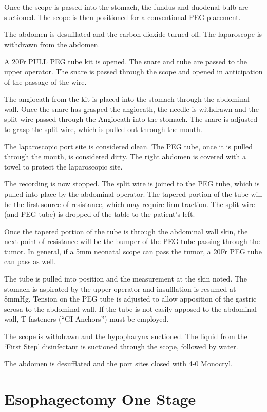 \documentclass[
]{book}
\begin{document}
Once the scope is passed into the stomach, the fundus and duodenal bulb are suctioned. The scope is then positioned for a conventional PEG placement.

The abdomen is desufflated and the carbon dioxide turned off. The laparoscope is withdrawn from the abdomen.

A 20Fr PULL PEG tube kit is opened. The snare and tube are passed to the upper operator. The snare is passed through the scope and opened in anticipation of the passage of the wire.

The angiocath from the kit is placed into the stomach through the abdominal wall. Once the snare has grasped the angiocath, the needle is withdrawn and the split wire passed through the Angiocath into the stomach. The snare is adjusted to grasp the split wire, which is pulled out through the mouth.

The laparoscopic port site is considered clean. The PEG tube, once it is pulled through the mouth, is considered dirty. The right abdomen is covered with a towel to protect the laparoscopic site.

The recording is now stopped. The split wire is joined to the PEG tube, which is pulled into place by the abdominal operator. The tapered portion of the tube will be the first source of resistance, which may require firm traction. The split wire (and PEG tube) is dropped of the table to the patient's left.

Once the tapered portion of the tube is through the abdominal wall skin, the next point of resistance will be the bumper of the PEG tube passing through the tumor. In general, if a 5mm neonatal scope can pass the tumor, a 20Fr PEG tube can pass as well.

The tube is pulled into position and the measurement at the skin noted. The stomach is aspirated by the upper operator and insufflation is resumed at 8mmHg. Tension on the PEG tube is adjusted to allow apposition of the gastric serosa to the abdominal wall. If the tube is not easily apposed to the abdominal wall, T fasteners (``GI Anchors'') must be employed.

The scope is withdrawn and the hypopharynx suctioned. The liquid from the `First Step' disinfectant is suctioned through the scope, followed by water.

The abdomen is desufflated and the port sites closed with 4-0 Monocryl.

\hypertarget{esophagectomy-one-stage}{%
\chapter{Esophagectomy One Stage}\label{esophagectomy-one-stage}}
\end{document}
